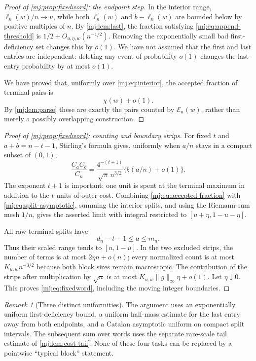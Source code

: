 \documentclass[11pt,a4paper]{article}
\theoremstyle{definition}\newaliascnt{definition}{theorem}
\theoremstyle{remark}\newaliascnt{remark}{theorem}
\newtheorem{remark}[remark]{Remark}
\begin{document}
\begin{proof}[Proof of \cref{mj:prop:fixedword}: the endpoint step]
In the interior range, $\ell_n(w)/n\to u$, while both $\ell_n(w)$ and
$b-\ell_n(w)$ are bounded below by positive multiples of $n$. By
\cref{mj:lem:last}, the fraction satisfying \eqref{mj:eq:append-threshold}
is $1/2+O_{u,\eta,w}(n^{-1/2})$. Removing the exponentially small bad
first-deficiency set changes this by $o(1)$. We have not assumed that the
first and last entries are independent: deleting any event of probability
$o(1)$ changes the last-entry probability by at most $o(1)$.

We have proved that, uniformly over \eqref{mj:eq:interior}, the accepted
fraction of terminal pairs is
\begin{equation}
 \chi(w)+o(1).
 \label{mj:eq:accepted-fraction}
\end{equation}
By \cref{mj:lem:parse} these are exactly the pairs counted by
$\mathcal E_n(w)$, rather than merely a possibly overlapping construction.
\end{proof}

\begin{proof}[Proof of \cref{mj:prop:fixedword}: counting and boundary strips]
For fixed $t$ and $a+b=n-t-1$, Stirling's formula gives, uniformly when
$a/n$ stays in a compact subset of $(0,1)$,
\begin{equation}
 \frac{C_aC_b}{C_n}
 =\frac{4^{-(t+1)}}{\sqrt\pi\,n^{3/2}}
       \bigl\{\mathfrak k(a/n)+o(1)\bigr\}.
 \label{mj:eq:split-asymptotic}
\end{equation}
The exponent $t+1$ is important: one unit is spent at the terminal maximum in
addition to the $t$ units of outer cost. Combining
\eqref{mj:eq:accepted-fraction} with \eqref{mj:eq:split-asymptotic},
summing the interior splits, and using the Riemann-sum mesh $1/n$, gives the
asserted limit with integral restricted to $[u+\eta,1-u-\eta]$.

All raw terminal splits have
\[
 d_n-t-1\le a\le m_n.
\]
Thus their scaled range tends to $[u,1-u]$. In the two excluded strips, the
number of terms is at most $2\eta n+o(n)$; every normalized count is at most
$K_{u,w}n^{-3/2}$ because both block sizes remain macroscopic. The
contribution of the strips after multiplication by $\sqrt n$ is at most
$K_{u,w}\|g\|_\infty\eta+o(1)$. Let $\eta\downarrow0$. This proves
\eqref{mj:eq:fixedword}, including the moving integer boundaries.
\end{proof}

\begin{remark}[Three distinct uniformities]
The argument uses an exponentially uniform first-deficiency bound, a uniform
half-mass estimate for the last entry away from both endpoints, and a Catalan
asymptotic uniform on compact split intervals. The subsequent sum over words
uses the separate rare-scale tail estimate of \cref{mj:lem:cost-tail}. None
of these four tasks can be replaced by a pointwise ``typical block''
statement.
\end{remark}
\end{document}

